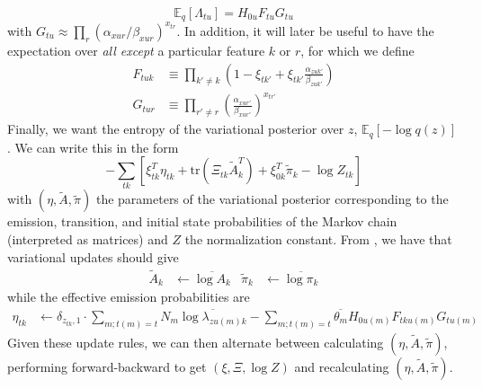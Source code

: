 \documentclass{article} %
\begin{document}
\begin{equation}
    \label{HFG}
    \mathbb{E}_q[\Lambda_{tu}] = H_{0u} F_{tu} G_{tu}
\end{equation}
with $G_{tu} \approx \prod_r (\alpha_{xur}/\beta_{xur})^{x_{tr}}$. In addition, it will later be useful to have the expectation over \emph{all except} a particular feature $k$ or $r$, for which we define
\begin{align}
    \label{F}
    F_{tuk} &\equiv \prod_{k'\neq k} \left(1 - \xi_{tk'} + \xi_{tk'} \frac{\alpha_{zuk'}}{\beta_{zuk'}} \right) \\
    \label{G}
    G_{tur} &\equiv \prod_{r' \neq r} \left(\frac{\alpha_{xur'}}{\beta_{xur'}} \right)^{x_{tr'}}
\end{align}
Finally, we want the entropy of the variational posterior over $z$, $\mathbb{E}_q[-\log q(z)]$. We can write this in the form
\begin{equation}
    -\sum_{tk} \left[
        \xi_{tk}^T\eta_{tk} + \text{tr}\left(\Xi_{tk} \tilde{A}_k^T \right)
        + \xi_{0k}^T\tilde{\pi}_k
        - \log Z_{tk}
    \right]
\end{equation}
with $(\eta, \tilde{A}, \tilde{\pi})$ the parameters of the variational posterior corresponding to the emission, transition, and initial state probabilities of the Markov chain (interpreted as matrices) and $Z$ the normalization constant. From \cite{beal2003variational}, we have that variational updates should give
\begin{align}
    \tilde{A}_k &\leftarrow \overline{\log A_k} &
    \tilde{\pi}_k &\leftarrow \overline{\log \pi_k}
\end{align}
while the effective emission probabilities are
\begin{align}
    \eta_{tk} &\leftarrow \delta_{z_{tk}, 1}\cdot \sum_{m; t(m) = t} N_m \overline{\log \lambda_{zu(m)k}} - \sum_{m; t(m) = t} \overline{\theta_m} H_{0u(m)} F_{tku(m)} G_{tu(m)}
\end{align}
Given these update rules, we can then alternate between calculating $(\eta, \tilde{A}, \tilde{\pi})$, performing forward-backward to get $(\xi, \Xi, \log Z)$ and recalculating $(\eta, \tilde{A}, \tilde{\pi})$.
\end{document}
